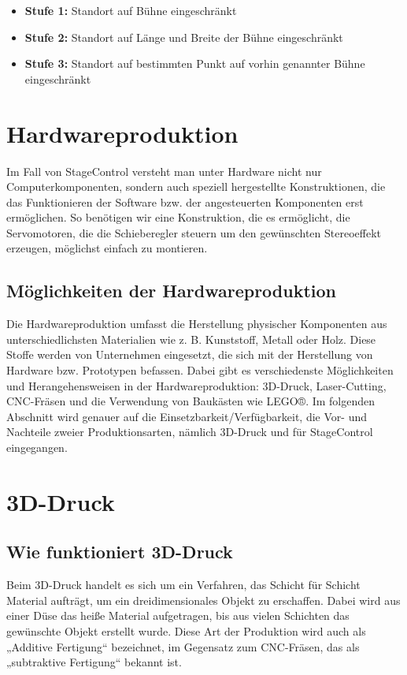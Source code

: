 \begin{itemize}
	\item \textbf{Stufe 1: }Standort auf Bühne eingeschränkt
	\item \textbf{Stufe 2: }Standort auf Länge und Breite der Bühne eingeschränkt
	\item \textbf{Stufe 3: }Standort auf bestimmten Punkt auf vorhin genannter Bühne eingeschränkt
\end{itemize}

\section{Hardwareproduktion}
Im Fall von StageControl versteht man unter Hardware nicht nur Computerkomponenten, sondern auch speziell hergestellte Konstruktionen, die das Funktionieren der Software bzw. der angesteuerten Komponenten erst ermöglichen. So benötigen wir eine Konstruktion, die es ermöglicht, die Servomotoren, die die Schieberegler steuern um den gewünschten Stereoeffekt erzeugen, möglichst einfach zu montieren. 

\subsection{Möglichkeiten der Hardwareproduktion}
Die Hardwareproduktion umfasst die Herstellung physischer Komponenten aus unterschiedlichsten Materialien wie z. B. Kunststoff, Metall oder Holz. Diese Stoffe werden von Unternehmen eingesetzt, die sich mit der Herstellung von Hardware bzw. Prototypen befassen. Dabei gibt es verschiedenste Möglichkeiten und Herangehensweisen in der Hardwareproduktion: 3D-Druck, Laser-Cutting, CNC-Fräsen und die Verwendung von Baukästen wie LEGO®. Im folgenden Abschnitt wird genauer auf die Einsetzbarkeit/Verfügbarkeit, die Vor- und Nachteile zweier Produktionsarten, nämlich 3D-Druck und  für StageControl eingegangen.

\section{3D-Druck}
\subsection{Wie funktioniert 3D-Druck}
Beim 3D-Druck handelt es sich um ein Verfahren, das Schicht für Schicht Material aufträgt, um ein dreidimensionales Objekt zu erschaffen. Dabei wird aus einer Düse das heiße Material aufgetragen, bis aus vielen Schichten das gewünschte Objekt erstellt wurde. Diese Art der Produktion wird auch als „Additive Fertigung“ bezeichnet, im Gegensatz zum CNC-Fräsen, das als „subtraktive Fertigung“ bekannt ist.

